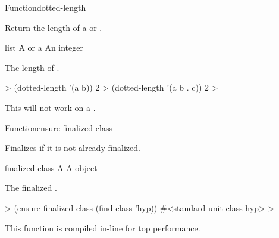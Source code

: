 \documentclass[10pt,twoside,english,pdftex]{article}
\newcommand{\inline}{This function is compiled in-line for top performance.}
\begin{document}
\begin{functiondoc}{Function}{dotted-length}{
  \returns{} }
%
%

\fnsyntax

\fnpurpose Return the length of a  or .

\fnpackage {}

\fnmodule {}

\fnargs
\begin{args}{list}
\arg[list] A  or a 
\arg[n] An integer
\end{args}

\fnreturns The length of .

\fnexamples
%
\W\supp
\begin{example}
  > (dotted-length '(a b))
  2
  > (dotted-length '(a b . c))
  2
  >
\end{example}

\fnnote This  will not work on a .

\end{functiondoc}


\begin{functiondoc}{Function}{ensure-finalized-class}{ 
    \returns{} }
%
%

\fnsyntax

\fnpurpose Finalizes  if it is not already finalized.

\fnpackage {}

\fnmodule {}

\fnargs
\begin{args}{finalized-class}
\arg[class] A 
 A  object
\end{args}

\fnreturns The finalized .

\fnexample
%
\W\supp
\begin{example}
  > (ensure-finalized-class (find-class 'hyp))
  #<standard-unit-class hyp>
  >
\end{example}

\fnnote \inline

\end{functiondoc}
\end{document}
